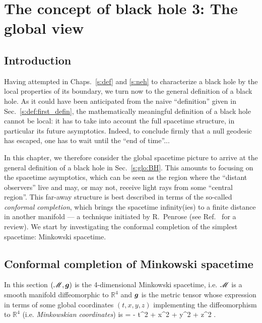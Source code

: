 \chapter{The concept of black hole 3: The global view}
\label{s:glo}

\minitoc

\section{Introduction}

Having attempted in Chaps.~\ref{s:def} and \ref{s:neh} to characterize a black hole by the local
properties of its boundary, we turn now to the general definition of a black
hole. As it could have been anticipated from the naive ``definition'' given
in Sec.~\ref{s:def:first_defin}, the mathematically meaningful definition
of a black hole cannot be local: it has to take into account the full
spacetime structure, in particular its future asymptotics. Indeed, to conclude
firmly that a null geodesic has escaped, one has to wait until the ``end
of time''...

In this chapter, we therefore consider the global spacetime picture to
arrive at the general definition of a black hole in
Sec.~\ref{s:glo:BH}.
This amounts to focusing on the
spacetime asymptotics, which can be seen as
the region where the ``distant observers'' live and may, or may not, receive
light rays from some ``central region''. This far-away structure is best
described in terms of the so-called \emph{conformal completion}, which brings
the spacetime infinity(ies) to a finite distance in another manifold
--- a technique initiated by R.~Penrose \cite{Penro63,Penro64} (see
Ref.~\cite{Fraue04} for a review).
We start by investigating the conformal completion of the simplest
spacetime: Minkowski spacetime.


\section{Conformal completion of Minkowski spacetime} \label{s:glo:conf_Mink}

In this section $(\mathscr{M},\bm{g})$ is the 4-dimensional Minkowski spacetime,
i.e. $\mathscr{M}$ is a smooth manifold diffeomorphic to $\mathbb{R}^4$ and $\bm{g}$
is the metric tensor whose expression in terms of some global coordinates
$(t, x, y, z)$ implementing the diffeomorphism to $\mathbb{R}^4$
(i.e. \emph{Minkowskian coordinates})
is
\be \label{e:glo:Mink_metric}
     = - \dd t^2 + \dd x^2 + \dd y^2 + \dd z^2 .
\ee

